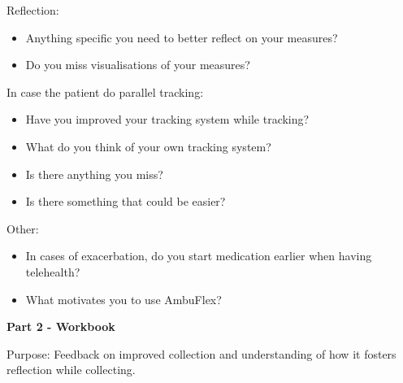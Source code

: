 Reflection:
\begin{itemize}
\item Anything specific you need to better reflect on your measures?%
\item Do you miss visualisations of your measures?%
\end{itemize}

In case the patient do parallel tracking:
\begin{itemize}
\item Have you improved your tracking system while tracking? %
\item What do you think of your own tracking system?%
\item Is there anything you miss?%
\item Is there something that could be easier?%
\end{itemize}

Other:
\begin{itemize}
\item In cases of exacerbation, do you start medication earlier when having telehealth?%
\item What motivates you to use AmbuFlex?%
\end{itemize}

\textbf{Part 2 - Workbook}

Purpose: Feedback on improved collection and understanding of how it fosters reflection while collecting.

